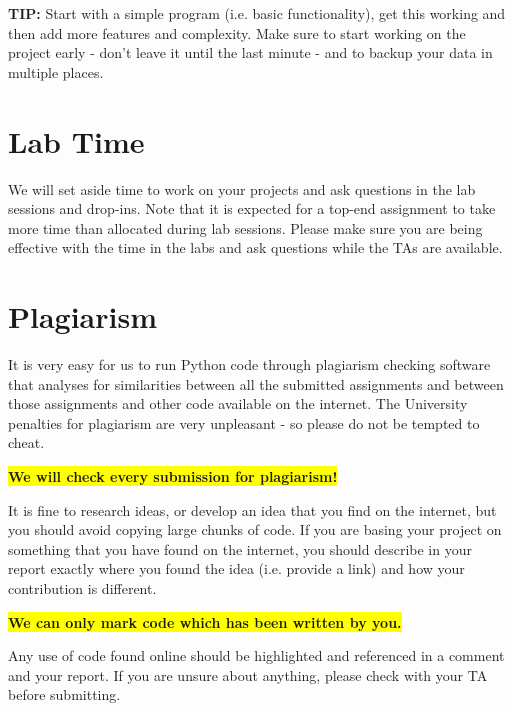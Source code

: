 \documentclass[12pt]{report}
\begin{document}
\begin{Exercise}[title=Exceptional submissions may include:]
\end{Exercise}

\bigskip
\textbf{TIP:} Start with a simple program (i.e. basic functionality), get this working and then add more features and complexity. Make sure to start working on the project early - don't leave it until the last minute - and to backup your data in multiple places.

\section*{Lab Time}
We will set aside time to work on your projects and ask questions in the lab sessions and drop-ins. Note that it is expected for a top-end assignment to take more time than allocated during lab sessions. Please make sure you are being effective with the time in the labs and ask questions while the TAs are available.

\section*{Plagiarism}
It is very easy for us to run Python code through plagiarism checking software that analyses for similarities between all the submitted assignments and between those assignments and other code available on the internet. The University penalties for plagiarism are very unpleasant - so please do not be tempted to cheat.

\begin{center}
\colorbox{yellow}{\textbf{We will check every submission for plagiarism!}}
\end{center}

It is fine to research ideas, or develop an idea that you find on the internet, but you should avoid copying large chunks of code. If you are basing your project on something that you have found on the internet, you should describe in your report exactly where you found the idea (i.e. provide a link) and how your contribution is different.

\begin{center}
    \colorbox{yellow}{\textbf{We can only mark code which has been written by you.}}
\end{center}
Any use of code found online should be highlighted and referenced in a comment and your report. If you are unsure about anything, please check with your TA before submitting.
\end{document}
